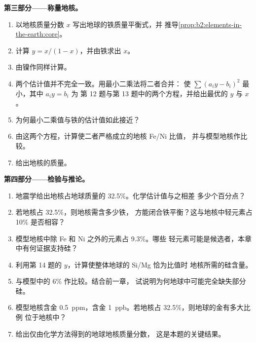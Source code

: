 \begin{problem}
\noindent\textbf{第三部分——称量地核。}
\begin{enumerate}[resume]
\item 以地核质量分数 $x$ 写出地球的铁质量平衡式，并
推导\cref{prop:b2:elements-in-the-earth:core}。
\item 计算 $y = x/(1-x)$，并由铁求出 $x$。
\item 由镍作同样计算。
\item 两个估计值并不完全一致。用最小二乘法将二者合并：
使 $\sum (a_iy - b_i)^2$ 最小，其中 $a_i y = b_i$ 为
第 12 题与第 13 题中的两个方程，并给出最优的 $y$ 与 $x$。
\item 为何最小二乘值与铁的估计值如此接近？
\item 由这两个方程，计算使二者严格成立的地核 Fe/Ni 比值，
并与模型地核作比较。
\item 给出地核的质量。
\end{enumerate}

\noindent\textbf{第四部分——检验与推论。}
\begin{enumerate}[resume]
\item 地震学给出地核占地球质量的 32.5\%。化学估计值与之相差
多少个百分点？
\item 若地核占 32.5\%，则地核需含多少铁，
方能闭合铁平衡？这与地核中轻元素占
10\% 是否相容？
\item 模型地核中除 Fe 和 Ni 之外的元素占 9.3\%。哪些
轻元素可能是候选者，本章中有何证据支持硅？
\item 利用第 14 题的 $y$，计算使整体地球的 Si/Mg 恰为比值时
地核所需的硅含量。
\item 与模型中的 6\% 作比较。结合前一章，
试说明为何地球中可能完全缺失部分硅。
\item 模型地核含金 \qty{0.5}{ppm}，含金
\qty{1}{ppb}。若地核占 32.5\%，则地球的金有多大比例
位于地核中？
\item 给出仅由化学方法得到的地球地核质量分数，
这是本题的关键结果。
\end{enumerate}
\end{problem}
